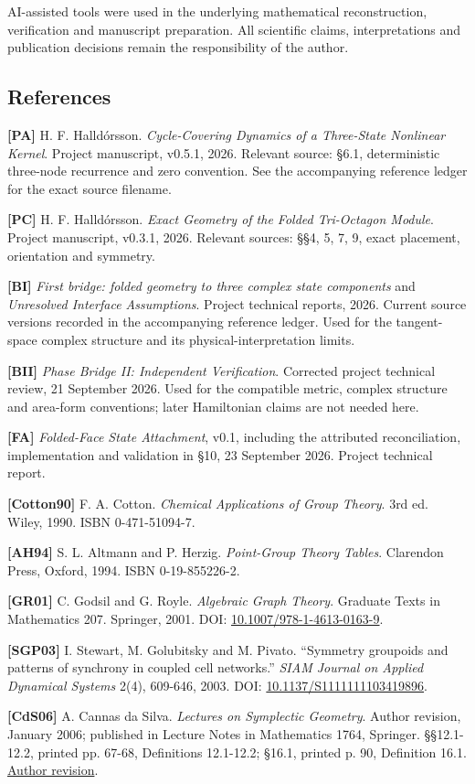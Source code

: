 \documentclass[
  11pt,
  a4paper,
]{article}
\begin{document}
AI-assisted tools were used in the underlying mathematical reconstruction, verification and manuscript preparation. All scientific claims, interpretations and publication decisions remain the responsibility of the author.

\subsection{References}\label{references}

\textbf{{[}PA{]}} H. F. Halldórsson. \emph{Cycle-Covering Dynamics of a Three-State Nonlinear Kernel}. Project manuscript, v0.5.1, 2026. Relevant source: §6.1, deterministic three-node recurrence and zero convention. See the accompanying reference ledger for the exact source filename.

\textbf{{[}PC{]}} H. F. Halldórsson. \emph{Exact Geometry of the Folded Tri-Octagon Module}. Project manuscript, v0.3.1, 2026. Relevant sources: §§4, 5, 7, 9, exact placement, orientation and symmetry.

\textbf{{[}BI{]}} \emph{First bridge: folded geometry to three complex state components} and \emph{Unresolved Interface Assumptions}. Project technical reports, 2026. Current source versions recorded in the accompanying reference ledger. Used for the tangent-space complex structure and its physical-interpretation limits.

\textbf{{[}BII{]}} \emph{Phase Bridge II: Independent Verification}. Corrected project technical review, 21 September 2026. Used for the compatible metric, complex structure and area-form conventions; later Hamiltonian claims are not needed here.

\textbf{{[}FA{]}} \emph{Folded-Face State Attachment}, v0.1, including the attributed reconciliation, implementation and validation in §10, 23 September 2026. Project technical report.

\textbf{{[}Cotton90{]}} F. A. Cotton. \emph{Chemical Applications of Group Theory}. 3rd ed. Wiley, 1990. ISBN 0-471-51094-7.

\textbf{{[}AH94{]}} S. L. Altmann and P. Herzig. \emph{Point-Group Theory Tables}. Clarendon Press, Oxford, 1994. ISBN 0-19-855226-2.

\textbf{{[}GR01{]}} C. Godsil and G. Royle. \emph{Algebraic Graph Theory}. Graduate Texts in Mathematics 207. Springer, 2001. DOI: \href{https://doi.org/10.1007/978-1-4613-0163-9}{10.1007/978-1-4613-0163-9}.

\textbf{{[}SGP03{]}} I. Stewart, M. Golubitsky and M. Pivato. ``Symmetry groupoids and patterns of synchrony in coupled cell networks.'' \emph{SIAM Journal on Applied Dynamical Systems} 2(4), 609-646, 2003. DOI: \href{https://doi.org/10.1137/S1111111103419896}{10.1137/S1111111103419896}.

\textbf{{[}CdS06{]}} A. Cannas da Silva. \emph{Lectures on Symplectic Geometry}. Author revision, January 2006; published in Lecture Notes in Mathematics 1764, Springer. §§12.1-12.2, printed pp. 67-68, Definitions 12.1-12.2; §16.1, printed p. 90, Definition 16.1. \href{https://people.math.ethz.ch/~acannas/Papers/lsg.pdf}{Author revision}.
\end{document}
